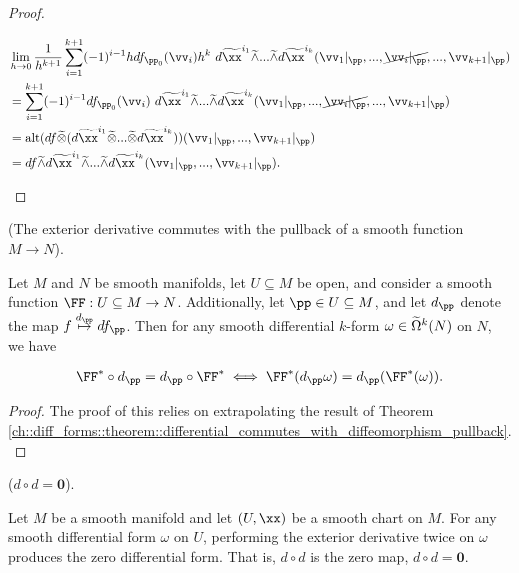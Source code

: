 \begin{proof}
\begin{enumerate}
        \begin{align*}
            &\lim_{h \rightarrow 0} \frac{1}{h^{k + 1}} \sum_{i = 1}^{k + 1} (-1)^{i - 1} h df_{\pp_0}(\vv_i) h^k \spc d\tx^{i_1} \twedge ... \twedge d\tx^{i_k}(\vv_1|_\pp, ..., \cancel{\vv_i|_\pp}, ..., \vv_{k + 1}|_\pp) \\
            &= \sum_{i = 1}^{k + 1} (-1)^{i - 1} df_{\pp_0}(\vv_i) \spc d\tx^{i_1} \twedge ... \twedge d\tx^{i_k}(\vv_1|_\pp, ..., \cancel{\vv_i|_\pp}, ..., \vv_{k + 1}|_\pp) \\
            &= \alt(df \totimes (d\tx^{i_1} \totimes ... \totimes d\tx^{i_k}))(\vv_1|_\pp, ..., \vv_{k + 1}|_\pp) \\
            &= df \twedge d\tx^{i_1} \twedge ... \twedge d\tx^{i_k}(\vv_1|_\pp, ..., \vv_{k + 1}|_\pp).
        \end{align*}
    \end{enumerate}
\end{proof}

\begin{theorem}
    \label{ch::exterior_pwrs::thm::exterior_derivative_commutes_with_pullback}
     (The exterior derivative commutes with the pullback of a smooth function $M \rightarrow N$).
    
    Let $M$ and $N$ be smooth manifolds, let $U \subseteq M$ be open, and consider a smooth function $\FF:U \subseteq M \rightarrow N$. Additionally, let $\pp \in U \subseteq M$, and let $d_\pp$ denote the map $f \overset{d_\pp}{\mapsto} df_\pp$. Then for any smooth differential $k$-form $\omega \in \widetilde{\Omega}^k(N)$ on $N$, we have
    
    \begin{align*}
        \FF^* \circ d_\pp = d_\pp \circ \FF^* \iff \FF^*(d_\pp \omega) = d_\pp ( \FF^*(\omega) ).
    \end{align*}
\end{theorem}

\begin{proof}
    The proof of this relies on extrapolating the result of Theorem \ref{ch::diff_forms::theorem::differential_commutes_with_diffeomorphism_pullback}.
\end{proof}

\begin{theorem}
     ($d \circ d = \mathbf{0}$).
    
    Let $M$ be a smooth manifold and let $(U, \xx)$ be a smooth chart on $M$. For any smooth differential form $\omega$ on $U$, performing the exterior derivative twice on $\omega$ produces the zero differential form. That is, $d \circ d$ is the zero map, $d \circ d = \mathbf{0}$.
\end{theorem}

